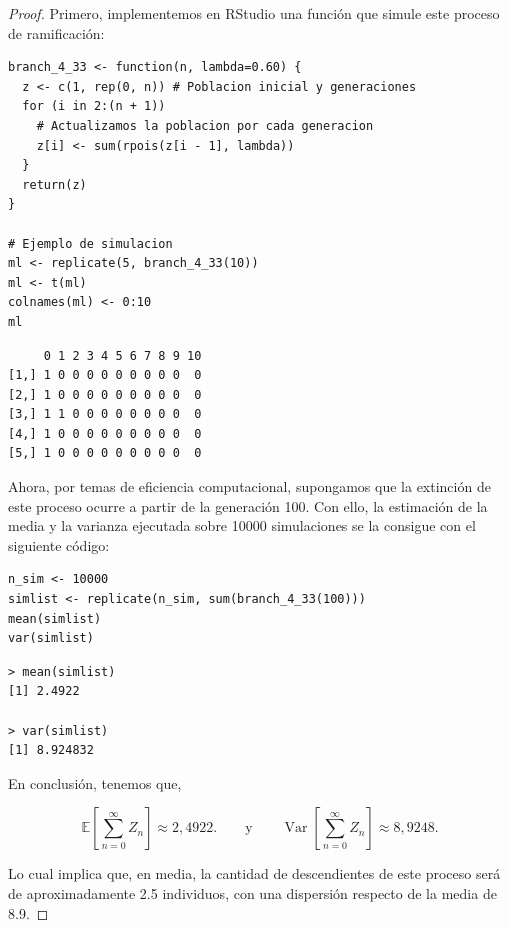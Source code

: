 \documentclass{article}
\begin{document}
\begin{proof}

Primero, implementemos en RStudio una función que simule este proceso de ramificación:

\begin{lstlisting}
branch_4_33 <- function(n, lambda=0.60) {
  z <- c(1, rep(0, n)) # Poblacion inicial y generaciones
  for (i in 2:(n + 1)) 
    # Actualizamos la poblacion por cada generacion
    z[i] <- sum(rpois(z[i - 1], lambda))
  }
  return(z)
}

# Ejemplo de simulacion
ml <- replicate(5, branch_4_33(10))
ml <- t(ml)
colnames(ml) <- 0:10
ml
\end{lstlisting}

\begin{lstlisting}
     0 1 2 3 4 5 6 7 8 9 10
[1,] 1 0 0 0 0 0 0 0 0 0  0
[2,] 1 0 0 0 0 0 0 0 0 0  0
[3,] 1 1 0 0 0 0 0 0 0 0  0
[4,] 1 0 0 0 0 0 0 0 0 0  0
[5,] 1 0 0 0 0 0 0 0 0 0  0
\end{lstlisting}

Ahora, por temas de eficiencia computacional, supongamos que la extinción de este proceso ocurre a partir de la generación 100. Con ello, la estimación de la media y la varianza ejecutada sobre 10000 simulaciones se la consigue con el siguiente código:

\begin{lstlisting}
n_sim <- 10000
simlist <- replicate(n_sim, sum(branch_4_33(100)))
mean(simlist)
var(simlist)
\end{lstlisting}

\begin{lstlisting}
> mean(simlist)
[1] 2.4922

> var(simlist)
[1] 8.924832
\end{lstlisting}

En conclusión, tenemos que,

\[
\mathbb{E}\left[\sum_{n=0}^{\infty} Z_n \right] \approx 2{,}4922.
\qquad \text{y} \qquad
\operatorname{Var}\left[\sum_{n=0}^{\infty} Z_n \right] \approx 8{,}9248.
\]

Lo cual implica que, en media, la cantidad de descendientes de este proceso será de aproximadamente 2.5 individuos, con una dispersión respecto de la media de 8.9.

\end{proof}
\end{document}

